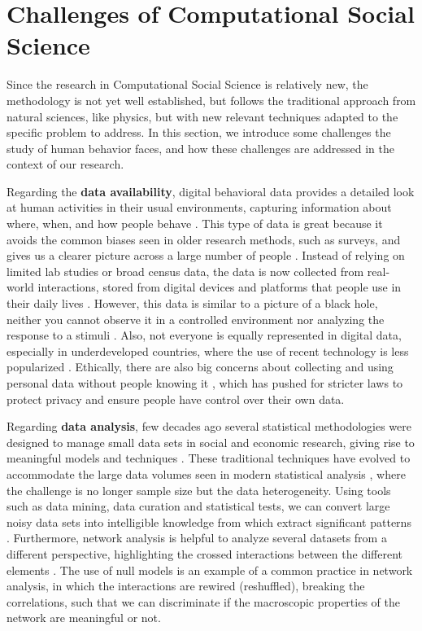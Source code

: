 \section{\label{sec:Challenges of Computational Social Science} Challenges of Computational Social Science}

Since the research in Computational Social Science is relatively new, the methodology is not yet well established, but follows the traditional approach from natural sciences, like physics, but with new relevant techniques adapted to the specific problem to address. In this section, we introduce some challenges the study of human behavior faces, and how these challenges are addressed in the context of our research.

Regarding the \textbf{data availability}, digital behavioral data provides a detailed look at human activities in their usual environments, capturing information about where, when, and how people behave \cite{Eagle2006RealityMining}. This type of data is great because it avoids the common biases seen in older research methods, such as surveys, and gives us a clearer picture across a large number of people \cite{Lazer2009CompSocSci,chen-2014}. Instead of relying on limited lab studies or broad census data, the data is now collected from real-world interactions, stored from digital devices and platforms that people use in their daily lives \cite{Eckmann2004Entropy,blondel-2015,artime-2017}. However, this data is similar to a picture of a black hole, neither you cannot observe it in a controlled environment nor analyzing the response to a stimuli \cite{lazer-2014}. Also, not everyone is equally represented in digital data, especially in underdeveloped countries, where the use of recent technology is less popularized \cite{zook-2017}. Ethically, there are also big concerns about collecting and using personal data without people knowing it \cite{boyd-2012, de-montjoye-2013}, which has pushed for stricter laws to protect privacy and ensure people have control over their own data.

Regarding  \textbf{data analysis}, few decades ago several statistical methodologies were designed to manage small data sets in social and economic research, giving rise to meaningful models and techniques \cite{stevens-2012, gelman-2006}. These traditional techniques have evolved to accommodate the large data volumes seen in modern statistical analysis \cite{hastie-2013}, where the challenge is no longer sample size but the data heterogeneity. Using tools such as data mining, data curation and statistical tests, we can convert large noisy data sets into intelligible knowledge from which extract significant patterns \cite{witten-2005}. Furthermore, network analysis is helpful to analyze several datasets from a different perspective, highlighting the crossed interactions between the different elements \cite{newman-book, clauset-2008}. The use of null models \cite{perry2012null,gauvin-2022} is an example of a common practice in network analysis, in which the interactions are rewired (reshuffled), breaking the correlations, such that we can discriminate if the macroscopic properties of the network are meaningful or not.

